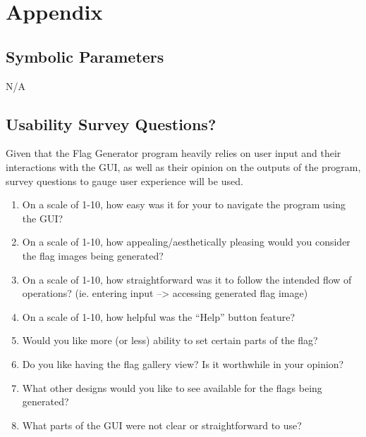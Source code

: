 \documentclass[12pt, titlepage]{article}
\begin{document}


\newpage

\section{Appendix}

\subsection{Symbolic Parameters}
N/A


\subsection{Usability Survey Questions?}
Given that the Flag Generator program heavily relies on user input and their interactions with the GUI, as well as their opinion on the outputs of the program,
survey questions to gauge user experience will be used.
\begin{enumerate}
    \item On a scale of 1-10, how easy was it for your to navigate the program using the GUI?
    \item On a scale of 1-10, how appealing/aesthetically pleasing would you consider the flag images being generated?
    \item On a scale of 1-10, how straightforward was it to follow the intended flow of operations? (ie. entering input --> accessing generated flag image)
    \item On a scale of 1-10, how helpful was the ``Help'' button feature?
    \item Would you like more (or less) ability to set certain parts of the flag?
    \item Do you like having the flag gallery view? Is it worthwhile in your opinion?
    \item What other designs would you like to see available for the flags being generated?
    \item What parts of the GUI were not clear or straightforward to use?
\end{enumerate}
\end{document}
